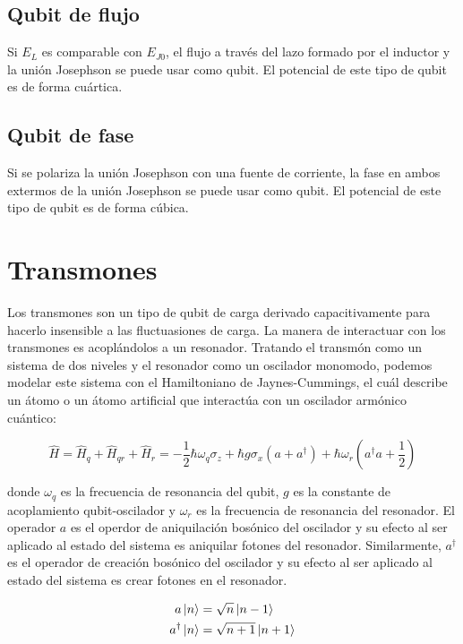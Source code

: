 \subsection{Qubit de flujo}

Si $E_L$ es comparable con $E_{J0}$, el flujo a través del lazo formado por el inductor y la unión Josephson se puede usar como qubit. El potencial de este tipo de qubit es de forma cuártica.

\subsection{Qubit de fase}

Si se polariza la unión Josephson con una fuente de corriente, la fase en ambos extermos de la unión Josephson se puede usar como qubit. El potencial de este tipo de qubit es de forma cúbica.

\section{Transmones}

Los transmones son un tipo de qubit de carga derivado capacitivamente para hacerlo insensible a las fluctuasiones de carga. La manera de interactuar con los transmones es acoplándolos a un resonador. Tratando el transmón como un sistema de dos niveles y el resonador como un oscilador monomodo, podemos modelar este sistema con el Hamiltoniano de Jaynes-Cummings, el cuál describe un átomo o un átomo artificial que interactúa con un oscilador armónico cuántico:

\begin{equation}
    \hat{H} = \hat{H}_q + \hat{H}_{qr} + \hat{H}_r = -\frac{1}{2} \hbar \omega_q \sigma_z + \hbar g \sigma_x (a+a^\dag) + \hbar \omega_r (a^\dag a + \frac{1}{2})
\end{equation}

donde $\omega_q$ es la frecuencia de resonancia del qubit, $g$ es la constante de acoplamiento qubit-oscilador y $\omega_r$ es la frecuencia de resonancia del resonador. El operador $a$ es el operdor de aniquilación bosónico del oscilador y su efecto al ser aplicado al estado del sistema es aniquilar fotones del resonador. Similarmente, $a^\dagger$ es el operador de creación bosónico del oscilador y su efecto al ser aplicado al estado del sistema es crear fotones en el resonador.

\begin{align}
    a \ket{n} &= \sqrt{n} \ket{n-1} \\
    a^\dagger \ket{n} &= \sqrt{n+1} \ket{n+1}
\end{align}

